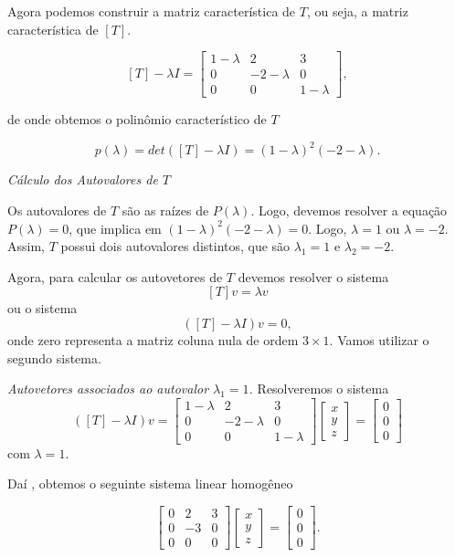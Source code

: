 \begin{enumerate}
Agora podemos construir a matriz característica de $T$,  ou seja, a matriz característica de $[T]$.

$$[T]-\lambda I=
\begin{bmatrix}
1 -\lambda & 2 & 3\\
0&-2-\lambda & 0\\
0&0&1-\lambda
\end{bmatrix},
$$

de onde obtemos o polinômio característico de $T$

$$p(\lambda)= det([T]-\lambda  I)= (1-\lambda)^2(-2-\lambda).$$

\textit{{Cálculo dos Autovalores de $T$}}

Os autovalores de $T$ são as raízes de $P(\lambda)$. Logo, devemos resolver a equação $P(\lambda)=0$, que implica em $(1-\lambda)^2(-2-\lambda)=0$. Logo, $\lambda=1$ ou $\lambda=-2$. Assim,  $T$ possui dois  autovalores  distintos, que são $\lambda_1=1$ e $\lambda_2=-2$.

Agora, para calcular os autovetores de $T$ devemos resolver o sistema $$[T]v=\lambda v$$ ou  o sistema $$ ([T]-\lambda I)v=0,$$ onde zero representa a matriz coluna nula de ordem $3 \times 1$. Vamos utilizar o segundo sistema.

\textit{{Autovetores associados ao autovalor $\lambda_1=1$.}} Resolveremos o sistema
$$
([T]-\lambda I)v=\begin{bmatrix}
1 -\lambda & 2 & 3\\
0&-2-\lambda & 0\\
0&0&1-\lambda
\end{bmatrix}
 \begin{bmatrix}
x\\
y \\
z
\end{bmatrix}=
\begin{bmatrix}
0\\
0 \\
0
\end{bmatrix}
$$
com  $\lambda=1$.

Daí ,  obtemos o seguinte sistema linear homogêneo

$$
\begin{bmatrix}
0 & 2 & 3\\
0&-3 & 0\\
0&0&0
\end{bmatrix}
\begin{bmatrix}
x\\
y \\
z
\end{bmatrix}=
\begin{bmatrix}
0\\
0 \\
0
\end{bmatrix}.
$$


\end{enumerate}
